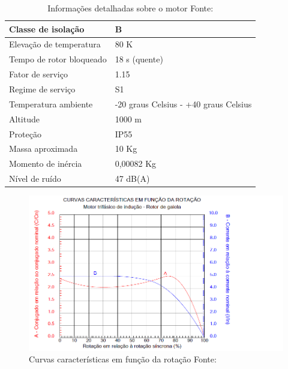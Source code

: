 \begin{table}[H]
\begin{center}
\begin{tabular}{|p{5cm}|p{5cm}|}
                \\ \hline
                Classe de isolação & B
                \\ \hline
                Elevação de temperatura & 80 K
                \\ \hline
                Tempo de rotor bloqueado & 18 s (quente)
                \\ \hline
                Fator de serviço & 1.15
                \\ \hline
                Regime de serviço & S1
                \\ \hline
                Temperatura ambiente & -20 graus Celsius - +40 graus Celsius
                \\ \hline
                Altitude & 1000 m
                \\ \hline
                Proteção & IP55
                \\ \hline
                Massa aproximada & 10 Kg
                \\ \hline
                Momento de inércia & 0,00082 Kg
                \\ \hline
                Nível de ruído & 47 dB(A)
                \\ \hline
              \end{tabular}
              \caption[Informações detalhadas sobre o motor]{Informações detalhadas sobre o motor
              \protect Fonte:\cite{WEG_catalogo} }
            \label{tabela_info_motor}
        \end{center}
    \end{table}
\newpage

\begin{figure}[H]
\centering
\includegraphics[scale=0.8]{figuras/motor_rota__o.png}
\caption{Curvas características em função da rotação Fonte: \cite{WEG_catalogo} }
\label{fig:motor_rota__o}
\end{figure}

